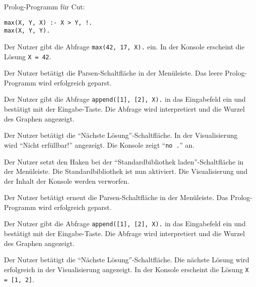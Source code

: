 \documentclass[parskip=full,11pt,twoside]{scrartcl}
\begin{document}

Prolog-Programm für Cut:
\label{tst:cut_prog}
\begin{lstlisting}
max(X, Y, X) :- X > Y, !.
max(X, Y, Y).
\end{lstlisting}

{Der Nutzer gibt die Abfrage \texttt{max(42, 17, X).} ein.}
{In der Konsole erscheint die Lösung \texttt{X = 42}.}


{Der Nutzer betätigt die Parsen-Schaltfläche in der Menüleiste.}
{Das leere Prolog-Programm wird erfolgreich geparst.}

{Der Nutzer gibt die Abfrage \texttt{append([1], [2], X).} in das Eingabefeld ein und bestätigt mit der Eingabe-Taste.}
{Die Abfrage wird interpretiert und die Wurzel des Graphen angezeigt.}

{Der Nutzer betätigt die \enquote{Nächste Lösung}-Schaltfläche.}
{In der Visualisierung wird \enquote{Nicht erfüllbar!} angezeigt. Die Konsole zeigt \enquote{\texttt{no .}} an.}

{Der Nutzer setzt den Haken bei der \enquote{Standardbibliothek laden}-Schaltfläche in der Menüleiste.}
{Die Standardbibliothek ist nun aktiviert. Die Visualisierung und der Inhalt der Konsole werden verworfen.}

{Der Nutzer betätigt erneut die Parsen-Schaltfläche in der Menüleiste.}
{Das Prolog-Programm wird erfolgreich geparst.}

{Der Nutzer gibt die Abfrage \texttt{append([1], [2], X).} in das Eingabefeld ein und bestätigt mit der Eingabe-Taste.}
{Die Abfrage wird interpretiert und die Wurzel des Graphen angezeigt.}

{Der Nutzer betätigt die \enquote{Nächste Lösung}-Schaltfläche.}
{Die nächste Lösung wird erfolgreich in der Visualisierung angezeigt. In der Konsole erscheint die Lösung \texttt{X = [1, 2]}.}
\end{document}
